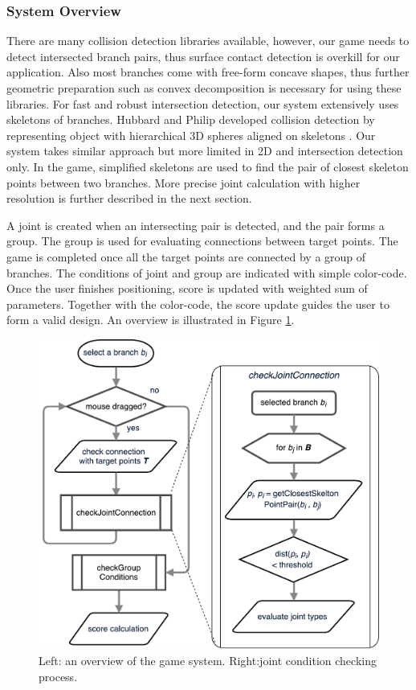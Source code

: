 \subsubsection*{System Overview}
There are many collision detection libraries available, however, our game needs to detect intersected branch pairs, thus surface contact detection is overkill for our application.
Also most branches come with free-form concave shapes, thus further geometric preparation such as convex decomposition is necessary for using these libraries.
For fast and robust intersection detection, our system extensively uses skeletons of branches.
Hubbard and Philip developed collision detection by representing object with hierarchical 3D spheres aligned on skeletons \cite{Hubbard:1996:APS:231731.231732}.
Our system takes similar approach but more limited in 2D and intersection detection only.
In the game, simplified skeletons are used to find the pair of closest skeleton points between two branches.
More precise joint calculation with higher resolution is further described in the next section.

A joint is created when an intersecting pair is detected, and the pair forms a group.
The group is used for evaluating connections between target points.
The game is completed once all the target points are connected by a group of branches.
The conditions of joint and group are indicated with simple color-code.
Once the user finishes positioning, score is updated with weighted sum of parameters.
Together with the color-code, the score update guides the user to form a valid design.
An overview is illustrated in Figure \ref{fig:system_flowchart}.

\begin{figure}[ht]
  \begin{center}
    \includegraphics[width = 0.25\paperwidth]{images/system/closestPointAlgorithm.pdf}
    \caption{Left: an overview of the game system. Right:joint condition checking process.}
    \label{fig:system_flowchart}
  \end{center}
\end{figure}


